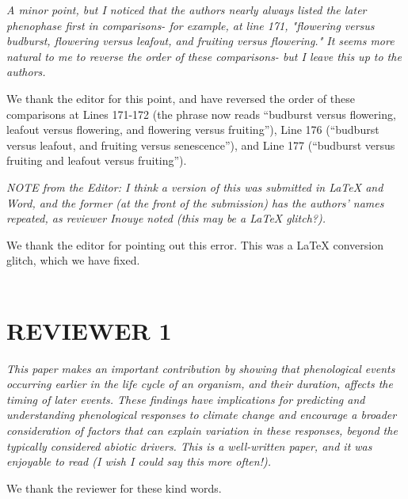 \documentclass[10.95pt,a4paper]{letter}
\begin{document}
\emph{A minor point, but I noticed that the authors nearly always listed the later phenophase first in comparisons- for example, at line 171, "flowering versus budburst, flowering versus leafout, and fruiting versus flowering."  It seems more natural to me to reverse the order of these comparisons- but I leave this up to the authors.}  
\par We thank the editor for this point, and have reversed the order of these comparisons at Lines 171-172 (the phrase now reads ``budburst versus flowering, leafout versus flowering, and flowering versus fruiting''), Line 176 (``budburst versus leafout, and fruiting versus senescence''), and Line 177 (``budburst versus fruiting and leafout versus fruiting''). 
\par \emph{NOTE from the Editor: I think a version of this was submitted in LaTeX and Word, and the former (at the front of the submission) has the authors' names repeated, as reviewer Inouye noted (this may be a LaTeX glitch?).}
\par We thank the editor for pointing out this error. This was a LaTeX conversion glitch, which we have fixed. 
\\
\\
\section {REVIEWER 1}
\par \emph{This paper makes an important contribution by showing that phenological events occurring earlier in the life cycle of an organism, and their duration, affects the timing of later events.  These findings have implications for predicting and understanding phenological responses to climate change and encourage a broader consideration of factors that can explain variation in these responses, beyond the typically considered abiotic drivers. This is a well-written paper, and it was enjoyable to read (I wish I could say this more often!).}
\par We thank the reviewer for these kind words.
\end{document}
